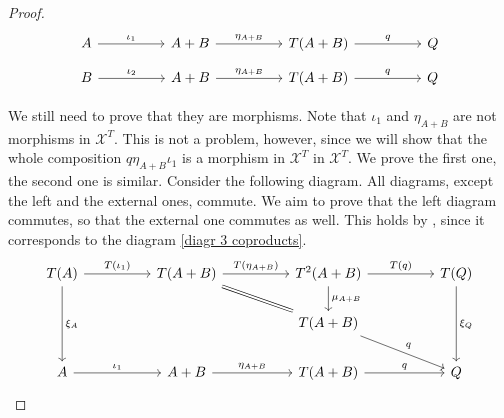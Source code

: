 \begin{subbox}{}
\begin{proof}
        \begin{minipage}{\textwidth}
        \[
\begin{tikzcd}
A \arrow[rr, "\iota_1"] &  & A+B \arrow[rr, "\eta_{A+B}"] &  & T(A+B) \arrow[rr, "q"] &  & Q
\end{tikzcd}
\]
\[
\begin{tikzcd}
B \arrow[rr, "\iota_2"] &  & A+B \arrow[rr, "\eta_{A+B}"] &  & T(A+B) \arrow[rr, "q"] &  & Q
\end{tikzcd}
\]
\end{minipage}
        We still need to prove that they are morphisms. Note that $\iota_1$ and $\eta_{A+B}$ are not morphisms in $\mathcal{X}^T$. This is not a problem, however, since we will show that the whole composition $q\eta_{A+B}\iota_1$ is a morphism in $\mathcal{X}^T$ in $\mathcal{X}^T$. We prove the first one, the second one is similar. Consider the following diagram. All diagrams, except the left and the external ones, commute. We aim to prove that the left diagram commutes, so that the external one commutes as well. This holds by , since it corresponds to the diagram \eqref{diagr 3 coproducts}.
        \[
\begin{tikzcd}
T(A) \arrow[dd, "\xi_A"] \arrow[rr, "T(\iota_1)"] &  & T(A+B) \arrow[rr, "T(\eta_{A+B})"] \arrow[rrd, equal] &  & T^2(A+B) \arrow[d, "\mu_{A+B}"] \arrow[rr, "T(q)"] &  & T(Q) \arrow[dd, "\xi_Q"] \\
                                                  &  &                                                               &  & T(A+B) \arrow[rrd, "q"]                            &  &                          \\
A \arrow[rr, "\iota_1"]                           &  & A+B \arrow[rr, "\eta_{A+B}"]                                  &  & T(A+B) \arrow[rr, "q"]                             &  & Q                       
\end{tikzcd}
        \]


\end{proof}
\end{subbox}
